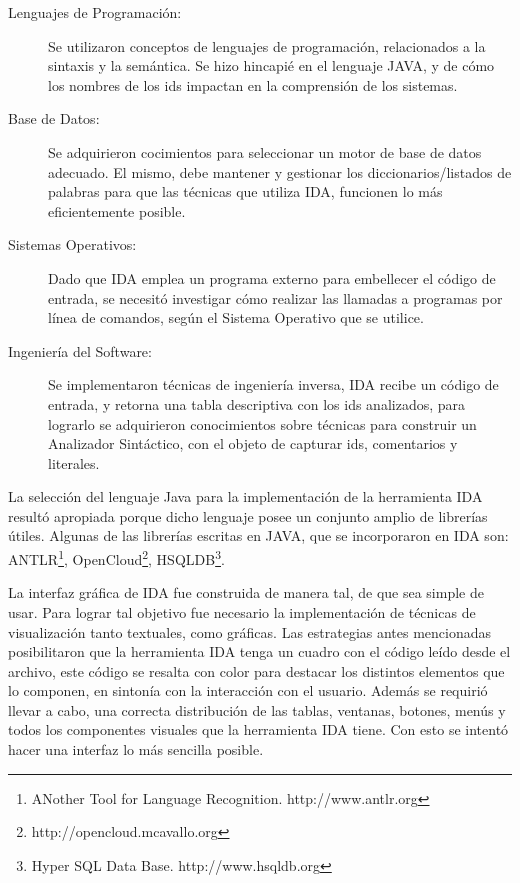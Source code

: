 \begin{description}

\item[Lenguajes de Programación:] Se utilizaron conceptos de lenguajes de programación, relacionados a la sintaxis y la semántica. Se hizo hincapié en el lenguaje JAVA, y de cómo los nombres de los ids impactan en la comprensión de los sistemas.

\item[Base de Datos:] Se adquirieron cocimientos para seleccionar un motor de base de datos adecuado. El mismo, debe mantener y gestionar los diccionarios/listados de palabras para que las técnicas que utiliza IDA, funcionen lo más eficientemente posible.

\item[Sistemas Operativos:] Dado que IDA emplea un programa externo para embellecer el código de entrada, se necesitó investigar cómo realizar las llamadas a programas por línea de comandos, según el Sistema Operativo que se utilice.


\item[Ingeniería del Software:] Se implementaron técnicas de ingeniería inversa, IDA recibe un código de entrada, y retorna una tabla descriptiva con los ids analizados, para lograrlo se adquirieron conocimientos sobre técnicas para construir un Analizador Sintáctico, con el objeto de capturar ids, comentarios y literales.

\end{description}

La selección del lenguaje Java para la implementación de la herramienta IDA resultó apropiada porque dicho lenguaje posee un conjunto amplio de librerías útiles. Algunas de las librerías escritas en JAVA, que se incorporaron en IDA son: ANTLR\footnote[1]{ANother Tool for Language Recognition. http://www.antlr.org}, OpenCloud\footnote[2]{http://opencloud.mcavallo.org}, HSQLDB\footnote[3]{Hyper SQL Data Base. http://www.hsqldb.org}.

La interfaz gráfica de IDA fue construida de manera tal, de que sea simple de usar. Para lograr tal objetivo fue necesario la implementación de técnicas de visualización tanto textuales, como gráficas. Las estrategias antes mencionadas posibilitaron que la herramienta IDA tenga un cuadro con el código leído desde el archivo, este código se resalta con color para destacar los distintos elementos que lo componen, en sintonía con la interacción con el usuario. Además se requirió llevar a cabo, una correcta distribución de las tablas, ventanas, botones, menús y todos los componentes visuales que la herramienta IDA tiene. Con esto se intentó hacer una interfaz lo más sencilla posible.


